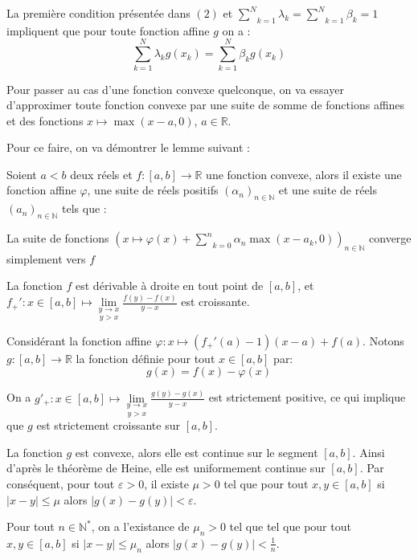 La premi{\`e}re condition pr{\'e}sent{\'e}e dans $(2)$ et $\underset{k =
1}{\overset{N}{\sum}} \lambda_k = \underset{k = 1}{\overset{N}{\sum}} \beta_k
= 1$ impliquent que pour toute fonction affine $g$ on a :
\[ \underset{k = 1}{\overset{N}{\sum}} \lambda_k g (x_k) = \underset{k =
   1}{\overset{N}{\sum}} \beta_k g (x_k) \]


Pour passer au cas d'une fonction convexe quelconque, on va essayer
d'approximer toute fonction convexe par une suite de somme de fonctions
affines et des fonctions $x \longmapsto \max (x - a, 0)$, $a \in \mathbb{R}$.

Pour ce faire, on va d{\'e}montrer le lemme suivant :

 Soient $a < b$ deux r{\'e}els et $f : [a, b] \rightarrow
\mathbb{R}$ une fonction convexe, alors il existe une fonction affine
$\varphi$, une suite de r{\'e}els positifs $(\alpha_n)_{n \in \mathbb{N}}$ et
une suite de r{\'e}els $(a_n)_{n \in \mathbb{N}}$ tels que :

La suite de fonctions $\left( x \longmapsto \varphi (x) + \underset{k =
0}{\overset{n}{\sum}} \alpha_n \max (x - a_k, 0) \right)_{n \in \mathbb{N}}$
converge simplement vers $f$


La fonction $f$ est d{\'e}rivable {\`a} droite en tout point de $[a, b]$, et
$f_+' : x \in [a, b] \longmapsto \underset{y > x}{\underset{y \rightarrow
x}{\lim}} \frac{f (y) - f (x)}{y - x}$ est croissante.

Consid{\'e}rant la fonction affine $\varphi : x \longmapsto (f_+' (a) - 1) (x
- a) + f (a)$. Notons $g : [a, b] \rightarrow \mathbb{R}$ la fonction
d{\'e}finie pour tout $x \in [a, b]$ par:
\[ g (x) = f (x) - \varphi (x) \]


On a $g'_+ : x \in [a, b] \longmapsto \underset{y > x}{\underset{y \rightarrow
x}{\lim}} \frac{g (y) - g (x)}{y - x}$ est strictement positive, ce qui
implique que $g$ est strictement croissante sur $[a, b]$.

La fonction $g$ est convexe, alors elle est continue sur le segment $[a, b]$.
Ainsi d'apr{\`e}s le th{\'e}or{\`e}me de Heine, elle est uniformement continue
sur $[a, b]$. Par cons{\'e}quent, pour tout $\varepsilon > 0$, il existe $\mu
> 0$ tel que pour tout $x, y \in [a, b]$ si $| x - y | \leqslant \mu$ alors $|
g (x) - g (y) | < \varepsilon$.

Pour tout $n \in \mathbb{N}^{\ast}$, on a l'existance de $\mu_n > 0$ tel que
tel que pour tout $x, y \in [a, b]$ si $| x - y | \leqslant \mu_n$ alors $| g
(x) - g (y) | < \frac{1}{n}$.

